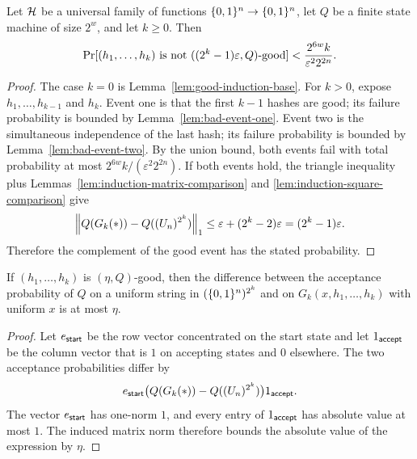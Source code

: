 \begin{lemma}
  \label{lem:good-sequence-probability}
  Let $\mathcal{H}$ be a universal family of functions $\{0,1\}^n\to\{0,1\}^n$, let
  $Q$ be a finite state machine of size $2^w$, and let $k\ge0$. Then
  \[
    \operatorname{Pr}[(h_1,\ldots,h_k)\text{ is not }((2^k-1)\varepsilon,Q)\text{-good}]
    < \frac{2^{6w}k}{\varepsilon^2 2^{2n}}.
  \]
\end{lemma}
\begin{proof}
  The case $k=0$ is Lemma~\ref{lem:good-induction-base}. For $k>0$, expose
  $h_1,\ldots,h_{k-1}$ and $h_k$. Event one is that the first $k-1$ hashes are
  good; its failure probability is bounded by Lemma~\ref{lem:bad-event-one}.
  Event two is the simultaneous independence of the last hash; its failure
  probability is bounded by Lemma~\ref{lem:bad-event-two}. By the union bound,
  both events fail with total probability at most
  $2^{6w}k/(\varepsilon^2 2^{2n})$. If both events hold, the triangle
  inequality plus Lemmas~\ref{lem:induction-matrix-comparison} and
  \ref{lem:induction-square-comparison} give
  \[
    \left\|Q(G_k(*))-Q((U_n)^{2^k})\right\|_1
    \le \varepsilon+(2^k-2)\varepsilon=(2^k-1)\varepsilon.
  \]
  Therefore the complement of the good event has the stated probability.
\end{proof}

\begin{lemma}
  \label{lem:acceptance-norm-bound}
  If $(h_1,\ldots,h_k)$ is $(\eta,Q)$-good, then the difference between the
  acceptance probability of $Q$ on a uniform string in $(\{0,1\}^n)^{2^k}$ and
  on $G_k(x,h_1,\ldots,h_k)$ with uniform $x$ is at most $\eta$.
\end{lemma}
\begin{proof}
  Let $e_{\mathsf{start}}$ be the row vector concentrated on the start state and let
  $1_{\mathsf{accept}}$ be the column vector that is $1$ on accepting states and $0$
  elsewhere. The two acceptance probabilities differ by
  \[
    e_{\mathsf{start}}\big(Q(G_k(*))-Q((U_n)^{2^k})\big)1_{\mathsf{accept}}.
  \]
  The vector $e_{\mathsf{start}}$ has one-norm $1$, and every entry of
  $1_{\mathsf{accept}}$ has absolute value at most $1$. The induced matrix norm
  therefore bounds the absolute value of the expression by $\eta$.
\end{proof}

